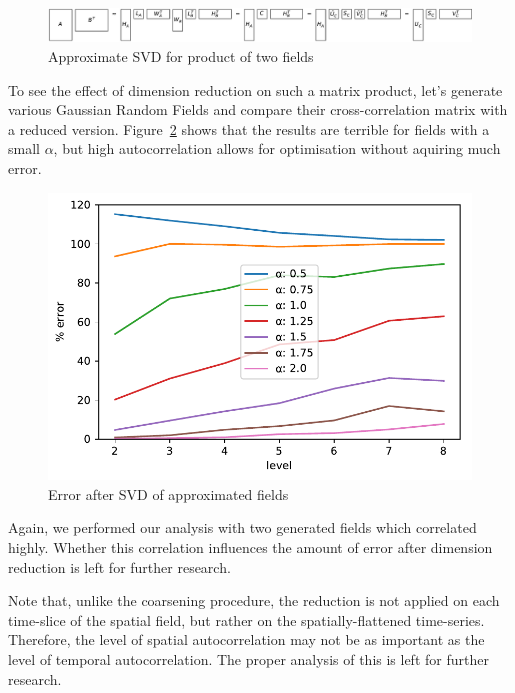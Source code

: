 \documentclass{acm_proc_article-sp}
\begin{document}
\begin{figure}[h]
\begin{center}
\includegraphics[width=\columnwidth]{Results/randomisedSquareProductSVD.pdf}
\caption[Approximate product SVD]{Approximate SVD for product of two fields}
\label{fig:randomisedSquareProductSVD}
\end{center}
\end{figure}
To see the effect of dimension reduction on such a matrix product, let's generate various Gaussian Random Fields and compare their cross-correlation matrix with a reduced version. Figure~\ref{fig:plotRandomisedSizeReducedMatrixProduct} shows that the results are terrible for fields with a small $\alpha$, but high autocorrelation allows for optimisation without aquiring much error.
\begin{figure}[h]
\begin{center}
\includegraphics[width=0.8\columnwidth]{Results/plotRandomisedSizeReducedMatrixProduct.pdf}
\caption[Error after SVD]{Error after SVD of approximated fields}
\label{fig:plotRandomisedSizeReducedMatrixProduct}
\end{center}
\end{figure}
Again, we performed our analysis with two generated fields which correlated highly. Whether this correlation influences the amount of error after dimension reduction is left for further research.


Note that, unlike the coarsening procedure, the reduction is not applied on each time-slice of the spatial field, but rather on the spatially-flattened time-series. Therefore, the level of spatial autocorrelation may not be as important as the level of temporal autocorrelation. The proper analysis of this is left for further research.
\end{document}
